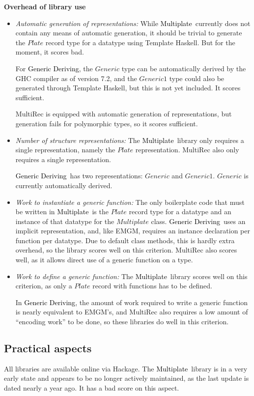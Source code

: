 \documentclass[twocolumn,11pt,a4paper]{article}
\newcommand{\multiplate}{\textcolor{black}{Multiplate}}
\newcommand{\genericderiving}{\textcolor{black}{Generic Deriving}}
\begin{document}
\textbf{Overhead of library use}
\begin{itemize}
\item \textit{Automatic generation of representations:} While \multiplate\ currently does not contain any means of automatic generation, it should be trivial to generate the $ Plate $ record type for a datatype using Template Haskell.
But for the moment, it scores bad.

For \genericderiving, the $ Generic $ type can be automatically derived by the GHC compiler as of version 7.2, and the $ Generic1 $ type could also be generated through Template Haskell, but this is not yet included.
It scores sufficient.

MultiRec is equipped with automatic generation of representations, but generation fails for polymorphic types, so it scores sufficient.

\item \textit{Number of structure representations:} The \multiplate\ library only requires a single representation, namely the $ Plate $ representation.
MultiRec also only requires a single representation.

\genericderiving\ has two representations: $ Generic $ and $ Generic1 $. $ Generic $ is currently automatically derived.

\item \textit{Work to instantiate a generic function:} The only boilerplate code that must be written in \multiplate\ is the $ Plate $ record type for a datatype and an instance of that datatype for the $ Multiplate $ class.
\genericderiving\ uses an implicit representation, and, like EMGM, requires an instance declaration per function per datatype.
Due to default class methods, this is hardly extra overhead, so the library scores well on this criterion.
MultiRec also scores well, as it allows direct use of a generic function on a type.

\item \textit{Work to define a generic function:} The \multiplate\ library scores well on this criterion, as only a $ Plate $ record with functions has to be defined.

In \genericderiving, the amount of work required to write a generic function is nearly equivalent to EMGM's, and MultiRec also requires a low amount of ``encoding work'' to be done, so these libraries do well in this criterion.
\end{itemize}

\subsection{Practical aspects}
All libraries are available online via Hackage.
The \multiplate\ library is in a very early state and appears to be no longer actively maintained, as the last update is dated nearly a year ago.
It has a bad score on this aspect.
\end{document}
